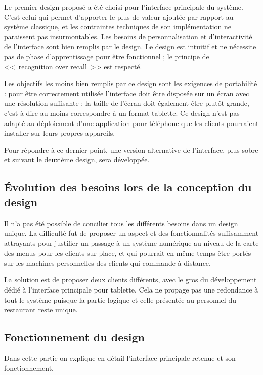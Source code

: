 \documentclass[a4paper,12pt]{article}
\begin{document}
Le premier design proposé a été choisi pour l'interface principale du système. C'est celui qui permet d'apporter
le plus de valeur ajoutée par rapport au système classique, et les contraintes techniques de son implémentation
ne paraissent pas insurmontables. Les besoins de personnalisation et d'interactivité de l'interface sont bien remplis
par le design. Le design est intuitif et ne nécessite pas de phase d'apprentissage pour être fonctionnel ; le 
principe de <<~recognition over recall~>> est respecté.

Les objectifs les moins bien remplis par ce design sont les exigences de portabilité : pour être correctement utilisée
l'interface doit être disposée sur un écran avec une résolution suffisante ; la taille de l'écran doit également
être plutôt grande, c'est-à-dire au moins correspondre à un format tablette. Ce design n'est pas adapté au déploiement
d'une application pour téléphone que les clients pourraient installer sur leurs propres appareils.

Pour répondre à ce dernier point, une version alternative de l'interface, plus sobre et suivant le deuxième design,
sera développée.

\subsection{Évolution des besoins lors de la conception du design}

Il n'a pas été possible de concilier tous les différents besoins dans un design unique. La difficulté fut de proposer
un aspect et des fonctionnalités suffisamment attrayants pour justifier un passage à un système numérique au niveau
de la carte des menus pour les clients sur place, et qui pourrait en même temps être portés sur les machines
personnelles des clients qui commande à distance.

La solution est de proposer deux clients différents, avec le gros du développement dédié à l'interface principale
pour tablette. Cela ne propage pas une redondance à tout le système puisque la partie logique et celle présentée
au personnel du restaurant reste unique.

\subsection{Fonctionnement du design}

Dans cette partie on explique en détail l'interface principale retenue et son fonctionnement.
\end{document}
